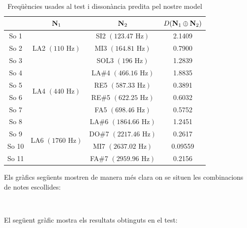\documentclass{article}
\theoremstyle{math}
\theoremstyle{TheoremNum}
\newcommand{\0}{\ensuremath{\vb{0}}}
\newcommand{\N}{\ensuremath{\vb{N}}}
\newcommand\Hz{\text{ Hz}}
\begin{document}
\begin{table}[ht]
    \centering
    \begin{tabular}{| c | c | c | c |}
    \cline{2-4}
    \multicolumn{1}{c|}{} & $\N_1$ & $\N_2$ & $D(\N_1\oplus\N_2)$\\
    \hline
    \hline
    So 1 & \multirow{3}{2.5cm}{LA2 $(110\Hz)$} & SI2 $(123.47\Hz)$ & 2.1409\\
    \cline{1-1}\cline{3-4}
    So 2 & & MI3 $(164.81\Hz)$ & 0.7900\\		
    \cline{1-1}\cline{3-4}
    So 3 & & SOL3 $(196\Hz)$  & 1.2839\\
    \hline
    So 4 & \multirow{4}{2.5cm}{LA4 $(440\Hz)$} & LA\#4 $(466.16\Hz)$ & 1.8835 \\
    \cline{1-1}\cline{3-4}
    So 5 & & RE5 $(587.33\Hz)$  & 0.3891 \\
    \cline{1-1}\cline{3-4}
    So 6 & & RE\#5 $(622.25\Hz)$ & 0.6032 \\
    \cline{1-1}\cline{3-4}
    So 7 & & FA5 $(698.46\Hz)$ & 0.5752 \\
    \hline
    So 8 & \multirow{4}{2.5cm}{LA6 $(1760\Hz)$} & LA\#6 $(1864.66\Hz)$ & 1.2451 \\
    \cline{1-1}\cline{3-4}
    So 9 & & DO\#7 $(2217.46\Hz)$ & 0.2617 \\
    \cline{1-1}\cline{3-4}
    So 10 & & MI7 $(2637.02\Hz)$ & 0.09559 \\
    \cline{1-1}\cline{3-4}
    So 11 & & FA\#7 $(2959.96\Hz)$ & 0.2156 \\
    \hline
    \end{tabular}
    \caption{Freqüències usades al test i dissonància predita pel nostre model}
    \label{tab:3}
\end{table}\par
\noindent Els gràfics següents mostren de manera més clara on se situen les combinacions de notes escollides:
\begin{center}
    
    \\
    
\end{center}
\noindent El següent gràfic mostra els resultats obtinguts en el test:\par
\end{document}
